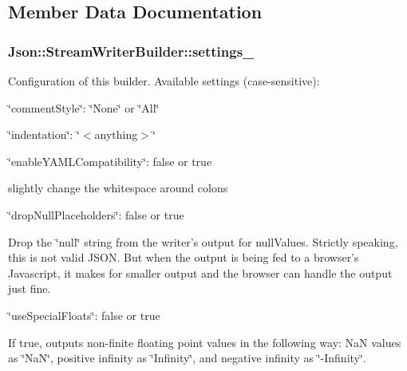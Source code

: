 \subsection{Member Data Documentation}
\hypertarget{class_json_1_1_stream_writer_builder_a79bdf2e639a52f4e758c0b95bd1d3423}{
\subsubsection[{settings\-\_\-}]{ Json\-::\-Stream\-Writer\-Builder\-::settings\-\_\-}}\label{class_json_1_1_stream_writer_builder_a79bdf2e639a52f4e758c0b95bd1d3423}
Configuration of this builder. Available settings (case-\/sensitive)\-:
\begin{DoxyItemize}
\item \char`\"{}comment\-Style\char`\"{}\-: \char`\"{}\-None\char`\"{} or \char`\"{}\-All\char`\"{}
\item \char`\"{}indentation\char`\"{}\-: \char`\"{}$<$anything$>$\char`\"{}
\item \char`\"{}enable\-Y\-A\-M\-L\-Compatibility\char`\"{}\-: false or true
\begin{DoxyItemize}
\item slightly change the whitespace around colons
\end{DoxyItemize}
\item \char`\"{}drop\-Null\-Placeholders\char`\"{}\-: false or true
\begin{DoxyItemize}
\item Drop the \char`\"{}null\char`\"{} string from the writer's output for null\-Values. Strictly speaking, this is not valid J\-S\-O\-N. But when the output is being fed to a browser's Javascript, it makes for smaller output and the browser can handle the output just fine.
\end{DoxyItemize}
\item \char`\"{}use\-Special\-Floats\char`\"{}\-: false or true
\begin{DoxyItemize}
\item If true, outputs non-\/finite floating point values in the following way\-: Na\-N values as \char`\"{}\-Na\-N\char`\"{}, positive infinity as \char`\"{}\-Infinity\char`\"{}, and negative infinity as \char`\"{}-\/\-Infinity\char`\"{}.
\end{DoxyItemize}
\end{DoxyItemize}

